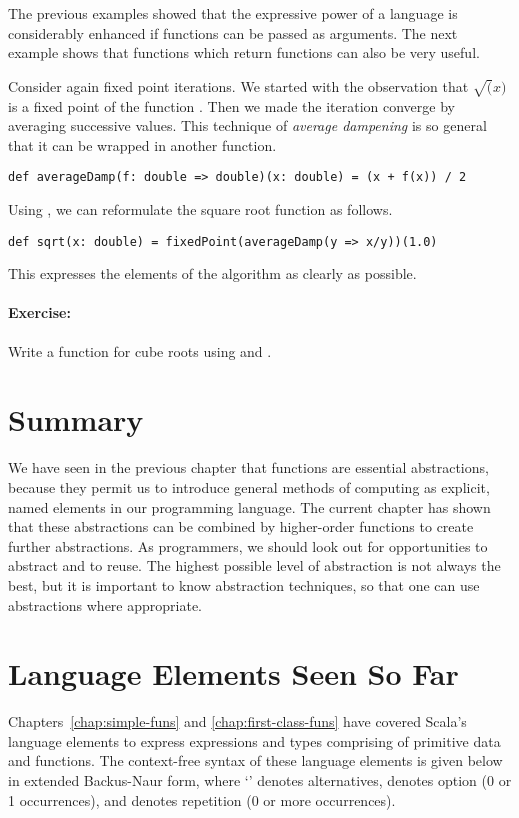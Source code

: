 \documentclass[a4paper,12pt,twoside,titlepage]{book}
\newcommand{\exercise}{\paragraph{Exercise:}}
\begin{document}
The previous examples showed that the expressive power of a language
is considerably enhanced if functions can be passed as arguments.  The
next example shows that functions which return functions can also be
very useful.

Consider again fixed point iterations. We started with the observation
that $\sqrt(x)$ is a fixed point of the function .
Then we made the iteration converge by averaging successive values.
This technique of {\em average dampening} is so general that it
can be wrapped in another function.
\begin{lstlisting}
def averageDamp(f: double => double)(x: double) = (x + f(x)) / 2
\end{lstlisting}
Using , we can reformulate the square root function
as follows.
\begin{lstlisting}
def sqrt(x: double) = fixedPoint(averageDamp(y => x/y))(1.0)
\end{lstlisting}
This expresses the elements of the algorithm as clearly as possible.

\exercise Write a function for cube roots using  and 
.

\section{Summary}

We have seen in the previous chapter that functions are essential
abstractions, because they permit us to introduce general methods of
computing as explicit, named elements in our programming language.
The current chapter has shown that these abstractions can be combined by
higher-order functions to create further abstractions.  As
programmers, we should look out for opportunities to abstract and to
reuse. The highest possible level of abstraction is not always the
best, but it is important to know abstraction techniques, so that one
can use abstractions where appropriate.

\section{Language Elements Seen So Far}

Chapters~\ref{chap:simple-funs} and \ref{chap:first-class-funs} have
covered Scala's language elements to express expressions and types
comprising of primitive data and functions.  The context-free syntax
of these language elements is given below in extended Backus-Naur
form, where `\code{|}' denotes alternatives, \code{[...]} denotes
option (0 or 1 occurrences), and  denotes repetition (0 or
more occurrences).
\end{document}
